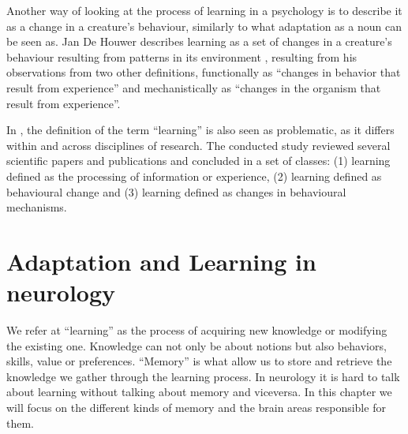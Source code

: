 \documentclass[conference]{IEEEtran}
\begin{document}
	Another way of looking at the process of learning in a psychology is to describe it as a change in a creature’s behaviour, similarly to what adaptation as a noun can be seen as. Jan De Houwer describes learning as a set of changes in a creature’s behaviour resulting from patterns in its environment \cite{b5}, resulting from his observations from two other definitions, functionally as “changes in behavior that result from experience” and mechanistically as “changes in the organism that result from experience”.

	In \cite{b6}, the definition of the term “learning” is also seen as problematic, as it differs within and across disciplines of research. The conducted study reviewed several scientific papers and publications and concluded in a set of classes: (1) learning defined as the processing of information or experience, (2) learning defined as behavioural change and (3) learning defined as changes in behavioural mechanisms.

\section{Adaptation and Learning in neurology}
	We refer at ``learning'' as the process of acquiring new knowledge or modifying the existing one. Knowledge can not only be about notions but also behaviors, skills, value or preferences.\cite{b7}
	``Memory'' is what allow us to store and retrieve the knowledge we gather through the learning process.
	In neurology it is hard to talk about learning without talking about memory and viceversa. In this chapter we will focus on the different kinds of memory and the brain areas responsible for them.
\end{document}
